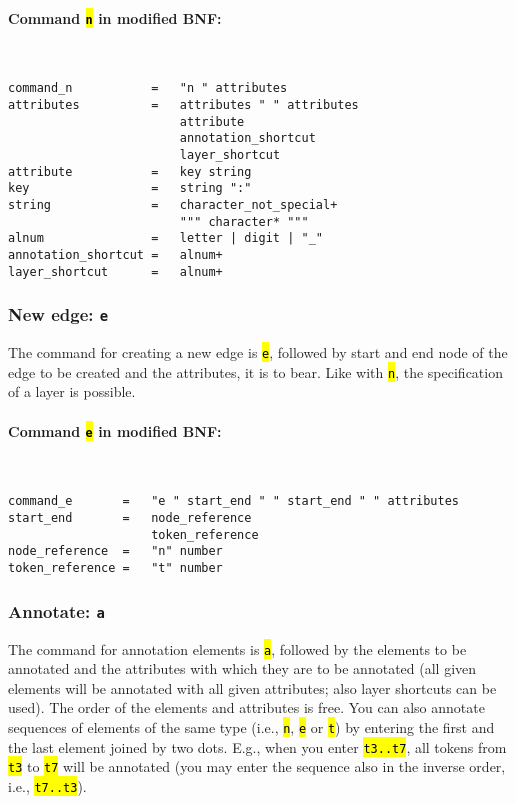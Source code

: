 \documentclass[12pt]{scrartcl}
\newcommand{\code}[1]{\hl{\texttt{#1}}}
\begin{document}
\paragraph*{Command \code{n} in modified BNF:}
~
\begin{lstlisting}
command_n           =   "n " attributes
attributes          =   attributes " " attributes
                        attribute
                        annotation_shortcut
                        layer_shortcut
attribute           =   key string
key                 =   string ":"
string              =   character_not_special+
                        """ character* """
alnum               =   letter | digit | "_"
annotation_shortcut =   alnum+
layer_shortcut      =   alnum+
\end{lstlisting}


\subsubsection{New edge: \texttt{e}}

The command for creating a new edge is \code{e}, followed by start and end node of the edge to be created and the attributes, it is to bear.
Like with \code{n}, the specification of a layer is possible.

\paragraph*{Command \code{e} in modified BNF:}
~
\begin{lstlisting}
command_e       =   "e " start_end " " start_end " " attributes
start_end       =   node_reference
                    token_reference
node_reference  =   "n" number
token_reference =   "t" number
\end{lstlisting}


\subsubsection{Annotate: \texttt{a}}\label{befehl-a}

The command for annotation elements is \code{a}, followed by the elements to be annotated and the attributes with which they are to be annotated (all given elements will be annotated with all given attributes; also layer shortcuts can be used).
The order of the elements and attributes is free.
You can also annotate sequences of elements of the same type (i.e., \code{n}, \code{e} or \code{t}) by entering the first and the last element joined by two dots.
E.g., when you enter \code{t3..t7}, all tokens from \code{t3} to \code{t7} will be annotated (you may enter the sequence also in the inverse order, i.e., \code{t7..t3}).
\end{document}
